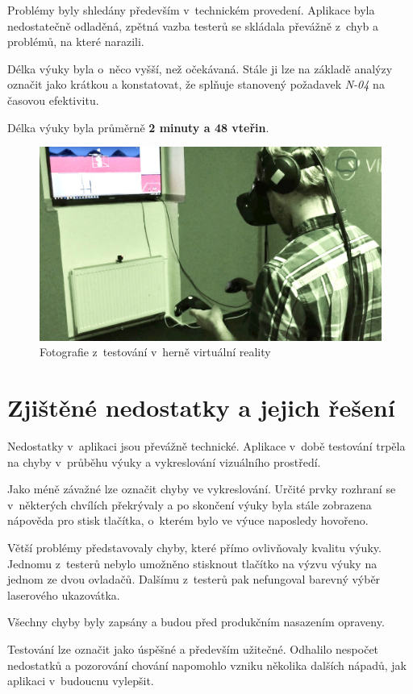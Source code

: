 Problémy byly shledány především v~technickém provedení. Aplikace 
byla nedostatečně odladěná, zpětná vazba testerů se skládala 
převážně z~chyb a problémů, na které narazili.

Délka výuky byla o~něco vyšší, než očekávaná. Stále ji lze na základě analýzy označit
jako krátkou a konstatovat, že splňuje stanovený požadavek \emph{N-04} na časovou efektivitu.

Délka výuky byla průměrně \textbf{2 minuty a 48 vteřin}.

\begin{figure}[h!]
\centering
\includegraphics[width=12cm]{src/assets/testing.jpg}
\caption{Fotografie z~testování v~herně virtuální reality}
\end{figure}

\section{Zjištěné nedostatky a jejich řešení}\label{zjiux161tux11bnuxe9-nedostatky}

Nedostatky v~aplikaci jsou převážně technické. Aplikace v~době testování trpěla na
chyby v~průběhu výuky a vykreslování vizuálního prostředí.

Jako méně závažné lze označit chyby ve vykreslování. Určité prvky rozhraní se v~některých
chvílích překrývaly a po skončení výuky byla stále zobrazena nápověda pro stisk
tlačítka, o~kterém bylo ve výuce naposledy hovořeno.

Větší problémy představovaly chyby, které přímo ovlivňovaly kvalitu 
výuky. Jednomu z~testerů nebylo umožněno stisknout tlačítko na výzvu 
výuky na jednom ze dvou ovladačů. Dalšímu z~testerů pak nefungoval 
barevný výběr laserového ukazovátka.

Všechny chyby byly zapsány a budou před produkčním nasazením opraveny.

Testování lze označit jako úspěšné a především užitečné. Odhalilo 
nespočet nedostatků a pozorování chování napomohlo vzniku
několika dalších nápadů, jak aplikaci v~budoucnu vylepšit.